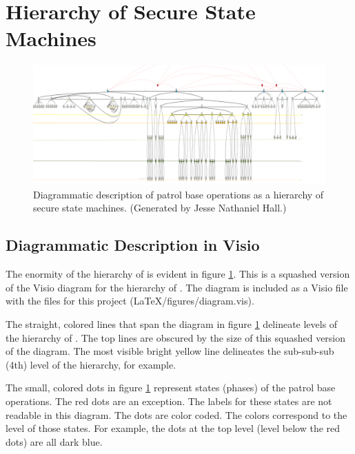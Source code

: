 \documentclass[../../main/main.tex]{subfiles}
\begin{document}
\section{Hierarchy of Secure State Machines}
\begin{figure}[h]
\includegraphics[width=\textwidth]{../figures/overalldiagramsquashed.png}
\caption{\label{overalldiagramsquashed}Diagrammatic description of patrol base operations as a hierarchy of secure state machines.  (Generated by Jesse Nathaniel Hall.)}
\end{figure}

\subsection{Diagrammatic Description in Visio}\label{ssec:overalldiagram}
The enormity of the hierarchy of  is evident in figure \ref{overalldiagramsquashed}.  This is a squashed version of the Visio diagram for the hierarchy of . The diagram is included as a Visio file with the files for this project (LaTeX/figures/diagram.vis).  

The straight, colored lines that span the diagram in figure \ref{overalldiagramsquashed} delineate levels of the hierarchy of .  The top lines are obscured by the size of this squashed version of the diagram.  The most visible bright yellow line delineates the sub-sub-sub (4th) level of the hierarchy, for example.


The small, colored dots in figure \ref{overalldiagramsquashed} represent states (phases) of the patrol base operations.  The red dots are an exception.  The labels for these states are not readable in this diagram.  The dots are color coded.  The colors correspond to the level of those states.  For example, the dots at the top level (level below the red dots) are all dark blue.  
\end{document}
